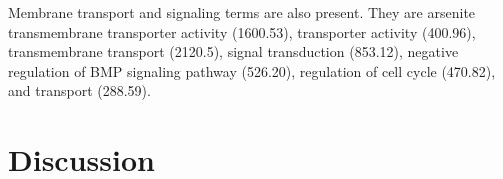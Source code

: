 Membrane transport and signaling terms are also present.
%
They are arsenite transmembrane transporter activity (1600.53), transporter activity (400.96), transmembrane transport (2120.5), signal transduction (853.12), negative regulation of BMP signaling pathway (526.20), regulation of cell cycle (470.82), and transport (288.59).








\section{Discussion} \label{chap:4-sec:discussion}















